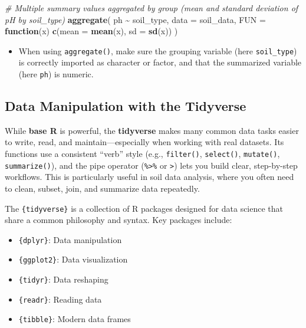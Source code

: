 \documentclass[
  10pt,
  b5paper,
  oneside]{book}
\newenvironment{Shaded}{\begin{snugshade}}{\end{snugshade}}
\newcommand{\AttributeTok}[1]{\textcolor[rgb]{0.13,0.29,0.53}{#1}}
\newcommand{\CommentTok}[1]{\textcolor[rgb]{0.56,0.35,0.01}{\textit{#1}}}
\newcommand{\ControlFlowTok}[1]{\textcolor[rgb]{0.13,0.29,0.53}{\textbf{#1}}}
\newcommand{\FunctionTok}[1]{\textcolor[rgb]{0.13,0.29,0.53}{\textbf{#1}}}
\newcommand{\NormalTok}[1]{#1}
\newcommand{\SpecialCharTok}[1]{\textcolor[rgb]{0.81,0.36,0.00}{\textbf{#1}}}
\providecommand{\tightlist}{%
  \setlength{\itemsep}{0pt}\setlength{\parskip}{0pt}}
\begin{document}
\begin{Shaded}
\begin{Highlighting}[]
\CommentTok{\# Multiple summary values aggregated by group (mean and standard deviation of pH by soil\_type)}
\FunctionTok{aggregate}\NormalTok{(}
\NormalTok{  ph }\SpecialCharTok{\textasciitilde{}}\NormalTok{ soil\_type,}
  \AttributeTok{data =}\NormalTok{ soil\_data,}
  \AttributeTok{FUN =} \ControlFlowTok{function}\NormalTok{(x) }\FunctionTok{c}\NormalTok{(}\AttributeTok{mean =} \FunctionTok{mean}\NormalTok{(x), }\AttributeTok{sd =} \FunctionTok{sd}\NormalTok{(x))}
\NormalTok{)}
\end{Highlighting}
\end{Shaded}

\begin{itemize}
\tightlist
\item
  When using \texttt{aggregate()}, make sure the grouping variable (here \texttt{soil\_type}) is correctly imported as character or factor, and that the summarized variable (here \texttt{ph}) is numeric.
\end{itemize}

\subsection{Data Manipulation with the Tidyverse}\label{tidyverse-manipultation}

While \textbf{base R} is powerful, the \textbf{tidyverse} makes many common data tasks easier to write, read, and maintain---especially when working with real datasets. Its functions use a consistent ``verb'' style (e.g., \texttt{filter()}, \texttt{select()}, \texttt{mutate()}, \texttt{summarize()}), and the pipe operator (\texttt{\%\textgreater{}\%} or \texttt{\textbar{}\textgreater{}}) lets you build clear, step-by-step workflows. This is particularly useful in soil data analysis, where you often need to clean, subset, join, and summarize data repeatedly.

The \texttt{\{tidyverse\}} is a collection of R packages designed for data science that share a common philosophy and syntax.
Key packages include:

\begin{itemize}
\item
  \texttt{\{dplyr\}}: Data manipulation
\item
  \texttt{\{ggplot2\}}: Data visualization
\item
  \texttt{\{tidyr\}}: Data reshaping
\item
  \texttt{\{readr\}}: Reading data
\item
  \texttt{\{tibble\}}: Modern data frames
\end{itemize}
\end{document}
